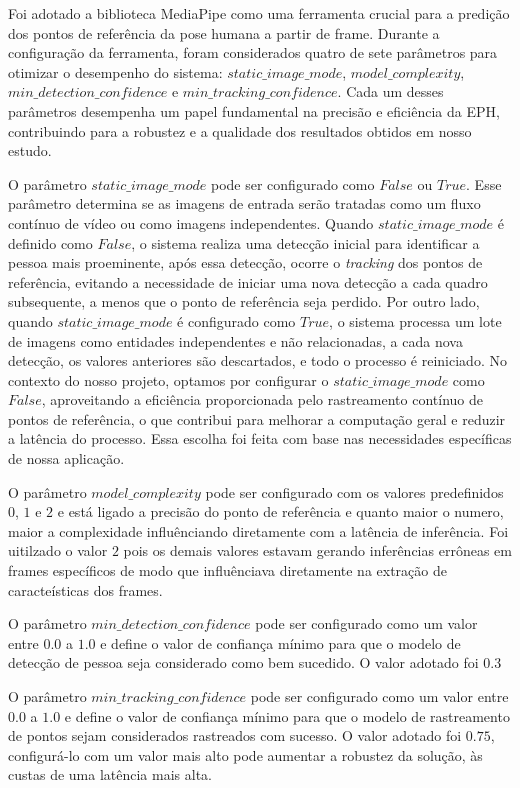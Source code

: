 Foi adotado a biblioteca MediaPipe como uma ferramenta crucial para a predição dos pontos de referência da pose humana a partir de frame. Durante a configuração da ferramenta, foram considerados quatro de sete parâmetros para otimizar o desempenho do sistema: $static\_image\_mode$, $model\_complexity$, $min\_detection\_confidence$ e $min\_tracking\_confidence$. Cada um desses parâmetros desempenha um papel fundamental na precisão e eficiência da \ac{EPH}, contribuindo para a robustez e a qualidade dos resultados obtidos em nosso estudo.

O parâmetro $static\_image\_mode$ pode ser configurado como $False$ ou $True$. Esse parâmetro determina se as imagens de entrada serão tratadas como um fluxo contínuo de vídeo ou como imagens independentes. Quando $static\_image\_mode$ é definido como $False$, o sistema realiza uma detecção inicial para identificar a pessoa mais proeminente, após essa detecção, ocorre o \textit{tracking} dos pontos de referência, evitando a necessidade de iniciar uma nova detecção a cada quadro subsequente, a menos que o ponto de referência seja perdido. Por outro lado, quando $static\_image\_mode$ é configurado como $True$, o sistema processa um lote de imagens como entidades independentes e não relacionadas, a cada nova detecção, os valores anteriores são descartados, e todo o processo é reiniciado. No contexto do nosso projeto, optamos por configurar o $static\_image\_mode$ como $False$, aproveitando a eficiência proporcionada pelo rastreamento contínuo de pontos de referência, o que contribui para melhorar a computação geral e reduzir a latência do processo. Essa escolha foi feita com base nas necessidades específicas de nossa aplicação.

O parâmetro $model\_complexity$ pode ser configurado com os valores predefinidos $0$, $1$ e $2$ e está ligado a precisão do ponto de referência e quanto maior o numero, maior a complexidade influênciando diretamente com a  latência de inferência. Foi uitilzado o valor $2$ pois os demais valores estavam gerando inferências errôneas em frames específicos de modo que influênciava diretamente na extração de caracteísticas dos frames.

O parâmetro $min\_detection\_confidence$ pode ser configurado como um valor entre $0.0$ a $1.0$ e define o valor de confiança mínimo para que o modelo  de detecção de pessoa seja considerado como bem sucedido. O valor adotado foi $0.3$ 

O parâmetro $min\_tracking\_confidence$ pode ser configurado como um valor entre $0.0$ a $1.0$ e define o valor de confiança mínimo para que o modelo de rastreamento de pontos   sejam considerados rastreados com sucesso. O valor adotado foi $0.75$, configurá-lo com um valor mais alto pode aumentar a robustez da solução, às custas de uma latência mais alta.


